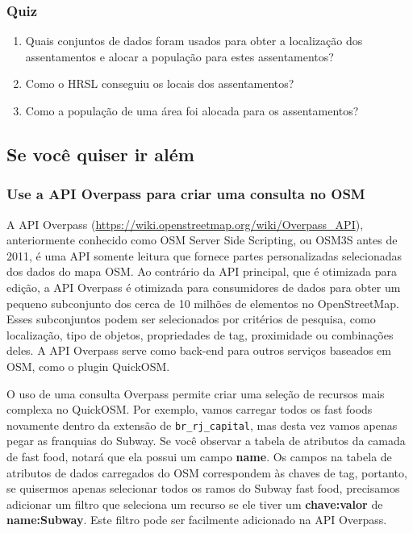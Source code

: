 \documentclass[
]{krantz}
\providecommand{\tightlist}{%
  \setlength{\itemsep}{0pt}\setlength{\parskip}{0pt}}
\begin{document}
\hypertarget{quiz-10}{%
\subsubsection{Quiz}\label{quiz-10}}

\begin{enumerate}
\def\labelenumi{\arabic{enumi}.}
\tightlist
\item
  Quais conjuntos de dados foram usados para obter a localização dos assentamentos e alocar a população para estes assentamentos?
\item
  Como o HRSL conseguiu os locais dos assentamentos?
\item
  Como a população de uma área foi alocada para os assentamentos?
\end{enumerate}

\hypertarget{se-vocuxea-quiser-ir-aluxe9m}{%
\subsection{Se você quiser ir além}\label{se-vocuxea-quiser-ir-aluxe9m}}

\hypertarget{use-a-api-overpass-para-criar-uma-consulta-no-osm}{%
\subsubsection{Use a API Overpass para criar uma consulta no OSM}\label{use-a-api-overpass-para-criar-uma-consulta-no-osm}}

A API Overpass (\href{https:/\%20/wiki.openstreetmap.org/wiki/Overpass_API}{https://wiki.openstreetmap.org/wiki/Overpass\_API}), anteriormente conhecido como OSM Server Side Scripting, ou OSM3S antes de 2011, é uma API somente leitura que fornece partes personalizadas selecionadas dos dados do mapa OSM. Ao contrário da API principal, que é otimizada para edição, a API Overpass é otimizada para consumidores de dados para obter um pequeno subconjunto dos cerca de 10 milhões de elementos no OpenStreetMap. Esses subconjuntos podem ser selecionados por critérios de pesquisa, como localização, tipo de objetos, propriedades de tag, proximidade ou combinações deles. A API Overpass serve como back-end para outros serviços baseados em OSM, como o plugin QuickOSM.

O uso de uma consulta Overpass permite criar uma seleção de recursos mais complexa no QuickOSM. Por exemplo, vamos carregar todos os fast foods novamente dentro da extensão de \texttt{br\_rj\_capital}, mas desta vez vamos apenas pegar as franquias do Subway. Se você observar a tabela de atributos da camada de fast food, notará que ela possui um campo \textbf{name}. Os campos na tabela de atributos de dados carregados do OSM correspondem às chaves de tag, portanto, se quisermos apenas selecionar todos os ramos do Subway fast food, precisamos adicionar um filtro que seleciona um recurso se ele tiver um \textbf{chave:valor} de \textbf{name:Subway}. Este filtro pode ser facilmente adicionado na API Overpass.
\end{document}
